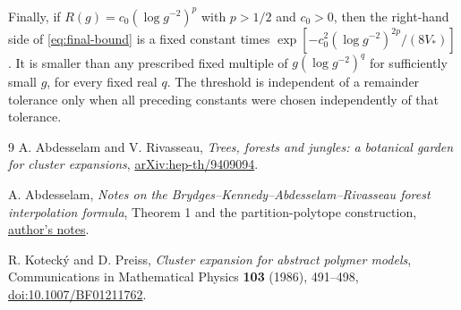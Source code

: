 \documentclass[11pt]{article}
\begin{document}
Finally, if $R(g)=c_0(\log g^{-2})^p$ with $p>1/2$ and $c_0>0$,
then the right-hand side of \eqref{eq:final-bound} is a fixed
constant times
$\exp[-c_0^2(\log g^{-2})^{2p}/(8V_*)]$.
It is smaller than any prescribed fixed multiple of
$g(\log g^{-2})^q$ for sufficiently small $g$, for every fixed
real $q$. The threshold is independent of a remainder tolerance
only when all preceding constants were chosen independently of
that tolerance.

\begin{thebibliography}{9}
A. Abdesselam and V. Rivasseau,
\emph{Trees, forests and jungles: a botanical garden for cluster expansions},
\href{https://arxiv.org/abs/hep-th/9409094}{arXiv:hep-th/9409094}.

A. Abdesselam,
\emph{Notes on the Brydges--Kennedy--Abdesselam--Rivasseau forest
interpolation formula}, Theorem 1 and the partition-polytope construction,
\href{https://mabdesselam.github.io/BKAR.pdf}{author's notes}.

R. Koteck\'y and D. Preiss,
\emph{Cluster expansion for abstract polymer models},
Communications in Mathematical Physics \textbf{103} (1986), 491--498,
\href{https://doi.org/10.1007/BF01211762}{doi:10.1007/BF01211762}.
\end{thebibliography}
\end{document}
